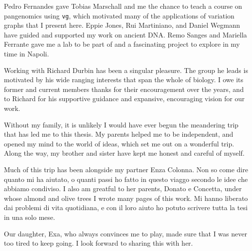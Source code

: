 \begin{acknowledgements}
  Pedro Fernandes gave Tobias Marschall and me the chance to teach a course on pangenomics using {\tt vg}, which motivated many of the applications of variation graphs that I present here.
  Eppie Jones, Rui Martiniano, and Daniel Wegmann have guided and supported my work on ancient DNA.
  Remo Sanges and Mariella Ferrante gave me a lab to be part of and a fascinating project to explore in my time in Napoli.
  
  Working with Richard Durbin has been a singular pleasure.
  The group he leads is motivated by his wide ranging interests that span the whole of biology.
  I owe its former and current members thanks for their encouragement over the years, and to Richard for his supportive guidance and expansive, encouraging vision for our work.

  Without my family, it is unlikely I would have ever begun the meandering trip that has led me to this thesis.
  My parents helped me to be independent, and opened my mind to the world of ideas, which set me out on a wonderful trip.
  Along the way, my brother and sister have kept me honest and careful of myself.

  Much of this trip has been alongside my partner Enza Colonna.
  Non so come dire quanto mi ha aiutato, o quanti passi ho fatto in questo viaggo secondo le idee che abbiamo condiviso.
  I also am greatful to her parents, Donato e Concetta, under whose almond and olive trees I wrote many pages of this work.
  Mi hanno liberato dai problemi di vita quotidiana, e con il loro aiuto ho potuto scrivere tutta la tesi in una solo mese.
  
  Our daughter, Exa, who always convinces me to play, made sure that I was never too tired to keep going.
  I look forward to sharing this with her.


\end{acknowledgements}
